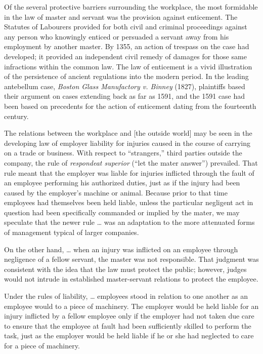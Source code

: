 \documentclass[
  letterpaper,
  11pt,
  DIV=9,
  openright]{scrbook}
\begin{document}
Of the several protective barriers surrounding the workplace, the most
formidable in the law of master and servant was the provision against
enticement. The Statutes of Labourers provided for both civil and
criminal proceedings against any person who knowingly enticed or
persuaded a servant away from his employment by another master. By 1355,
an action of trespass on the case had developed; it provided an
independent civil remedy of damages for those same infractions within
the common law. The law of enticement is a vivid illustration of the
persistence of ancient regulations into the modern period. In the
leading antebellum case, \emph{Boston Glass Manufactory v. Binney}
(1827), plaintiffs based their argument on cases extending back as far
as 1591, and the 1591 case had been based on precedents for the action
of enticement dating from the fourteenth century.

The relations between the workplace and {[}the outside world{]} may be
seen in the developing law of employer liability for injuries caused in
the course of carrying on a trade or business. With respect to
``strangers,'' third parties outside the company, the rule of
\emph{respondeat superior} (``let the mater answer'') prevailed. That
rule meant that the employer was liable for injuries inflicted through
the fault of an employee performing his authorized duties, just as if
the injury had been caused by the employer's machine or animal. Because
prior to that time employees had themselves been held liable, unless the
particular negligent act in question had been specifically commanded or
implied by the mater, we may speculate that the newer rule \ldots{} was
an adaptation to the more attenuated forms of management typical of
larger companies.

On the other hand, \ldots{} when an injury was inflicted on an employee
through negligence of a fellow servant, the master was not responsible.
That judgment was consistent with the idea that the law must protect the
public; however, judges would not intrude in established master-servant
relations to protect the employee.

Under the rules of liability, \ldots{} employees stood in relation to
one another as an employee would to a piece of machinery. The employer
would be held liable for an injury inflicted by a fellow employee only
if the employer had not taken due care to ensure that the employee at
fault had been sufficiently skilled to perform the task, just as the
employer would be held liable if he or she had neglected to care for a
piece of machinery.
\end{document}
